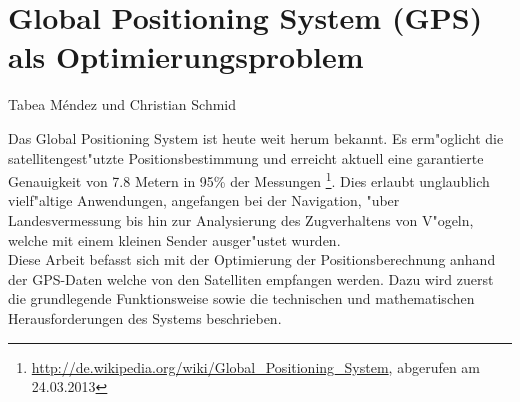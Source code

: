 %
%
%

\chapter{Global Positioning System (GPS) als Optimierungsproblem}

Tabea M\'endez und Christian Schmid
\bigskip
\bigskip


	Das Global Positioning System ist heute weit herum bekannt. Es erm"oglicht die satellitengest"utzte Positionsbestimmung und erreicht aktuell eine garantierte Genauigkeit von 7.8 Metern in 95\% der Messungen \footnote{\url{http://de.wikipedia.org/wiki/Global_Positioning_System}, abgerufen am 24.03.2013}. Dies erlaubt unglaublich vielf"altige Anwendungen, angefangen bei der Navigation, "uber Landesvermessung bis hin zur Analysierung des Zugverhaltens von V"ogeln, welche mit einem kleinen Sender ausger"ustet wurden.\\[0.15cm]	
	Diese Arbeit befasst sich mit der Optimierung der Positionsberechnung anhand der GPS-Daten welche von den Satelliten empfangen werden. Dazu wird zuerst die grundlegende Funktionsweise sowie die technischen und mathematischen Herausforderungen des Systems beschrieben.
	
